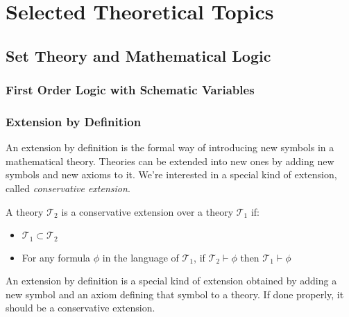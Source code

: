 \part{Selected Theoretical Topics}
\label{part:theory}

\chapter{Set Theory and Mathematical Logic}
\section{First Order Logic with Schematic Variables}
\label{sect:theoryfol}
\section{Extension by Definition}
An extension by definition is the formal way of introducing new symbols in a mathematical theory.
Theories can be extended into new ones by adding new symbols and new axioms to it. We're interested in a special kind of extension, called \textit{conservative extension}.
\begin{defin}
A theory $\mathcal{T}_2$ is a conservative extension over a theory $\mathcal{T}_1$ if:
\begin{itemize}
	\item $\mathcal{T}_1 \subset \mathcal{T}_2$
	\item For any formula $\phi$ in the language of $\mathcal{T}_1$, if $\mathcal{T}_2 \vdash 		\phi$ then $\mathcal{T}_1 \vdash \phi$
\end{itemize}
\end{defin}

An extension by definition is a special kind of extension obtained by adding a new symbol and an axiom defining that symbol to a theory. If done properly, it should be a conservative extension.

